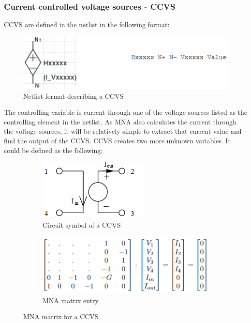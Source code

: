 \documentclass[12pt,a4paper]{article}
\begin{document}
\subsubsection{Current controlled voltage sources - CCVS}
CCVS are defined in the netlist in the following format: \par
\begin{figure} [h!]
	\centering
	\includegraphics[]{H.png}
	\caption{Netlist format describing a CCVS \cite{MNA}}
\end{figure}

The controlling variable is current through one of the voltage sources listed as the controlling element in the netlist.
As MNA also calculates the current through the voltage sources, it will be relatively simple to extract that current
value and find the output of the CCVS. CCVS creates two more unknown variables.
It could be defined as the following:
\begin{figure} [h!]
	\centering
	\begin{subfigure}{.5\textwidth}
	  \centering
	  \includegraphics[scale=0.8]{H_diagram.PNG}
	  \caption{Circuit symbol of a CCVS}
	  \label{fig:sub1}
	\end{subfigure}%
	\begin{subfigure}{.5\textwidth}
	  \centering
	  \includegraphics[width= \textwidth]{H_matrices.PNG}
	  \caption{MNA matrix entry}
	  \label{fig:sub2}
	\end{subfigure}
	\caption{MNA matrix for a CCVS \cite{jahn_margraf_habchi_jacob_2003}}
	\label{fig:test}
\end{figure}
\pagebreak
\end{document}
